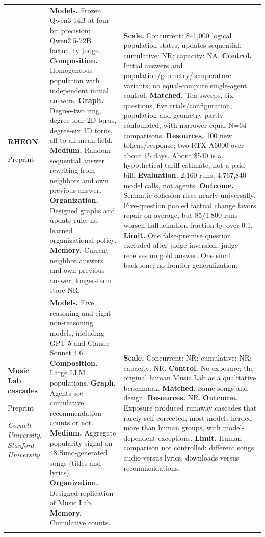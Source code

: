 \begin{longtable}{@{}>{\raggedright\arraybackslash}p{}>{\raggedright\arraybackslash}p{}>{\raggedright\arraybackslash}p{}@{}}
\textbf{RHEON}\par \citep{rheon-consensus}\par Preprint & \textbf{Models.} Frozen Qwen3-14B at four-bit precision; Qwen2.5-72B factuality judge. \textbf{Composition.} Homogeneous population with independent initial answers. \textbf{Graph.} Degree-two ring, degree-four 2D torus, degree-six 3D torus, all-to-all mean field. \textbf{Medium.} Random-sequential answer rewriting from neighbors and own previous answer. \textbf{Organization.} Designed graphs and update rule; no learned organizational policy. \textbf{Memory.} Current neighbor answers and own previous answer; longer-term store NR. & \textbf{Scale.} Concurrent: 8--1,000 logical population states; updates sequential; cumulative: NR; capacity: NA. \textbf{Control.} Initial answers and population/geometry/temperature variants; no equal-compute single-agent control. \textbf{Matched.} Ten sweeps, six questions, five trials/configuration; population and geometry partly confounded, with narrower equal-N=64 comparisons. \textbf{Resources.} 100 new tokens/response; two RTX A6000 over about 15 days. About \$540 is a hypothetical tariff estimate, not a paid bill. \textbf{Evaluation.} 2,160 runs; 4,767,840 model calls, not agents. \textbf{Outcome.} Semantic cohesion rises nearly universally. Five-question pooled factual change favors repair on average, but 85/1,800 runs worsen hallucination fraction by over 0.1. \textbf{Limit.} One false-premise question excluded after judge inversion; judge receives no gold answer. One small backbone; no frontier generalization. \\ \addlinespace[5pt]
\textbf{Music Lab cascades}\par \citep{herding-runaway-cascades}\par Preprint\par\emph{Cornell University, Stanford University} & \textbf{Models.} Five reasoning and eight non-reasoning models, including GPT-5 and Claude Sonnet 4.6. \textbf{Composition.} Large LLM populations. \textbf{Graph.} Agents see cumulative recommendation counts or not. \textbf{Medium.} Aggregate popularity signal on 48 Suno-generated songs (titles and lyrics). \textbf{Organization.} Designed replication of Music Lab. \textbf{Memory.} Cumulative counts. & \textbf{Scale.} Concurrent: NR; cumulative: NR; capacity: NR. \textbf{Control.} No exposure; the original human Music Lab as a qualitative benchmark. \textbf{Matched.} Same songs and design. \textbf{Resources.} NR. \textbf{Outcome.} Exposure produced runaway cascades that rarely self-corrected; most models herded more than human groups, with model-dependent exceptions. \textbf{Limit.} Human comparison not controlled: different songs, audio versus lyrics, downloads versus recommendations. \\ \addlinespace[5pt]

\end{longtable}
